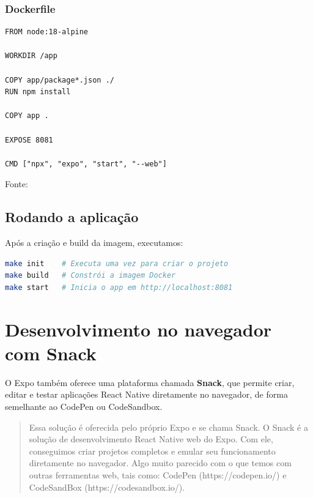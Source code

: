 
\subsubsection*{Dockerfile}

\begin{lstlisting}[caption={Dockerfile}]
FROM node:18-alpine

WORKDIR /app

COPY app/package*.json ./
RUN npm install

COPY app .

EXPOSE 8081

CMD ["npx", "expo", "start", "--web"]
\end{lstlisting}
Fonte: \cite{dockerReact}
\subsection{Rodando a aplicação}

Após a criação e build da imagem, executamos:

\begin{lstlisting}[language=bash]
make init    # Executa uma vez para criar o projeto
make build   # Constrói a imagem Docker
make start   # Inicia o app em http://localhost:8081
\end{lstlisting}

\section{Desenvolvimento no navegador com Snack}

O Expo também oferece uma plataforma chamada \textbf{Snack}, que permite criar, editar e testar aplicações React Native diretamente no navegador, de forma semelhante ao CodePen ou CodeSandbox.

\begin{quote}
Essa solução é oferecida pelo próprio Expo e se chama Snack. O Snack é a solução de desenvolvimento React Native web do Expo. Com ele, conseguimos criar projetos completos e emular seu funcionamento diretamente no navegador. Algo muito parecido com o que temos com outras ferramentas web, tais como: CodePen (https://codepen.io/) e CodeSandBox (https://codesandbox.io/).
\end{quote}

